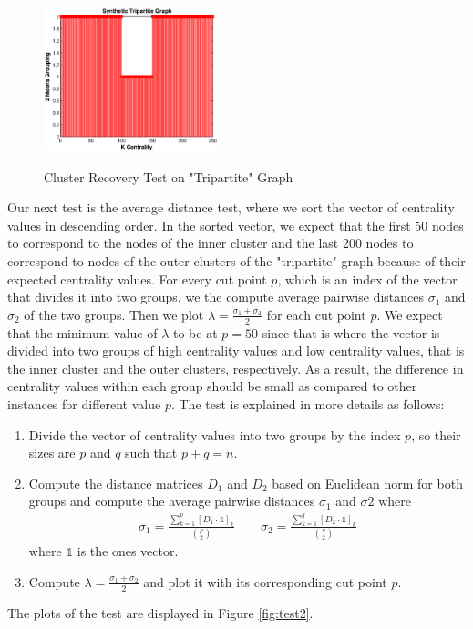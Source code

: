 \documentclass[10pt]{siamltex}
\begin{document}
\begin{pagewiselinenumbers}
\begin{figure}[h!]
{    \includegraphics[width=0.45\textwidth]{kcent_kmeans}
}
\caption{Cluster Recovery Test on "Tripartite" Graph}
\label{fig:test1}
\end{figure}


Our next test is the average distance test, where we sort the vector of centrality values in descending order. In the sorted vector, we expect that the first 50 nodes to correspond to the nodes of the inner cluster and the last 200 nodes to correspond to nodes of the outer clusters of the "tripartite" graph because of their expected centrality values. For every cut point $p$, which is an index of the vector that divides it into two groups, we the compute average pairwise distances $\sigma_1$ and $\sigma_2$ of the two groups. Then we plot $\lambda = \frac{\sigma_1 + \sigma_2}{2}$ for each cut point $p$. We expect that the minimum value of $\lambda$ to be at $p=50$ since that is where the vector is divided into two groups of high centrality values and low centrality values, that is the inner cluster and the outer clusters, respectively. As a result, the difference in centrality values within each group should be small as compared to other instances for different value $p$. The test is explained in more details as follows:
\begin{enumerate}
\item Divide the vector of centrality values into two groups by the index $p$, so their sizes are $p$ and $q$ such that $p+q=n$.
\item Compute the distance matrices $D_1$ and $D_2$ based on Euclidean norm for both groups and compute the average pairwise distances $\sigma_1$ and $\sigma2$ where
\begin{align}
  \sigma_1 = \frac{\sum_{k=1}^p [D_1 \cdot \mathds{1}]_k}{\binom{p}{2}} \quad \quad
      \sigma_2 = \frac{\sum_{k=1}^q [D_2 \cdot \mathds{1}]_k}{\binom{q}{2}}
\end{align}
where $\mathds{1}$ is the ones vector.
\item Compute $\lambda = \frac{\sigma_1+\sigma_2}{2}$ and plot it with its corresponding cut point $p$. 
\end{enumerate}
The plots of the test are displayed in Figure \ref{fig:test2}.


\end{pagewiselinenumbers}
\end{document}
